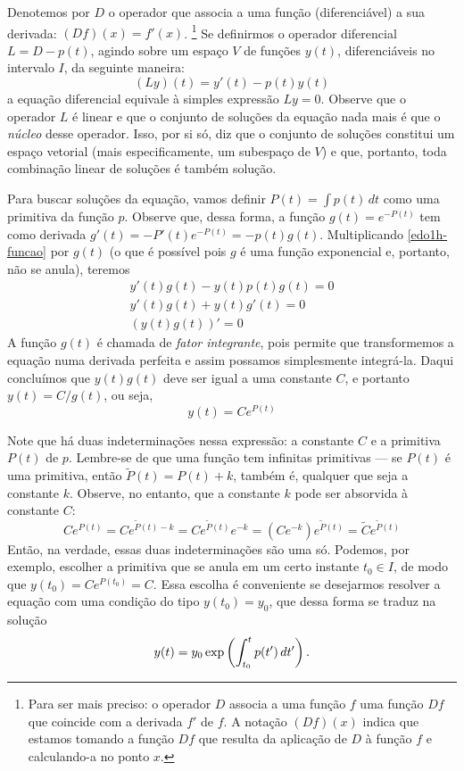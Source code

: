 \documentclass[12pt,a4paper,oneside]{memoir}
\begin{document}
Denotemos por $D$ o operador que associa a uma função (diferenciável) a sua derivada: $(Df)(x) = f'(x)$.%
  \footnote{Para ser mais preciso: o operador $D$ associa a uma função $f$ uma função $Df$ que coincide com a derivada $f'$ de $f$.  A notação $(Df)(x)$ indica que estamos tomando a função $Df$ que resulta da aplicação de $D$ à função $f$ e calculando-a no ponto $x$.}
Se definirmos o operador diferencial $L = D - p(t)$, agindo sobre um espaço $V$ de funções $y(t)$, diferenciáveis no intervalo $I$, da seguinte maneira:
\[
  (Ly)(t) = y'(t) - p(t) y(t)
\]
a equação diferencial equivale à simples expressão $Ly = 0$.  Observe que o operador $L$ é linear e que o conjunto de soluções da equação nada mais é que o \emph{núcleo} desse operador.  Isso, por si só, diz que o conjunto de soluções constitui um espaço vetorial (mais especificamente, um subespaço de $V$) e que, portanto, toda combinação linear de soluções é também solução.

Para buscar soluções da equação, vamos definir $P(t) = \int p(t)\,dt$ como uma primitiva da função $p$.  Observe que, dessa forma, a função $g(t) = e^{-P(t)}$ tem como derivada $g'(t) = -P'(t) e^{-P(t)} = -p(t) g(t)$.  Multiplicando \eqref{edo1h-funcao} por $g(t)$ (o que é possível pois $g$ é uma função exponencial e, portanto, não se anula), teremos
\begin{gather*}
  y'(t) g(t) - y(t) p(t) g(t) = 0 \\
  y'(t) g(t) + y(t) g'(t) = 0 \\
  \left( y(t) g(t) \right)' = 0
\end{gather*}
A função $g(t)$ é chamada de \emph{fator integrante}, pois permite que transformemos a equação numa derivada perfeita e assim possamos simplesmente integrá-la.  Daqui concluímos que $y(t) g(t)$ deve ser igual a uma constante $C$, e portanto $y(t) = C/g(t)$, ou seja,
\begin{equation}
  y(t) = C e^{P(t)}
\end{equation}

Note que há duas indeterminações nessa expressão: a constante $C$ e a primitiva $P(t)$ de $p$.  Lembre-se de que uma função tem infinitas primitivas --- se $P(t)$ é uma primitiva, então $\tilde{P}(t) = P(t) + k$, também é, qualquer que seja a constante $k$.  Observe, no entanto, que a constante $k$ pode ser absorvida à constante $C$:
\[
  C e^{P(t)}
  = C e^{\tilde{P}(t) - k}
  = C e^{\tilde{P}(t)} e^{-k}
  = (C e^{-k}) e^{\tilde{P}(t)}
  = \tilde{C} e^{\tilde{P}(t)}
\]
Então, na verdade, essas duas indeterminações são uma só.  Podemos, por exemplo, escolher a primitiva que se anula em um certo instante $t_0 \in I$, de modo que $y(t_0) = C e^{P(t_0)} = C$.  Essa escolha é conveniente se desejarmos resolver a equação com uma condição do tipo $y(t_0) = y_0$, que dessa forma se traduz na solução
\begin{equation}
  y(t) = y_0 \exp\left( \int_{t_0}^{t} p(t')\,dt' \right)  \text.
\end{equation}
\end{document}
